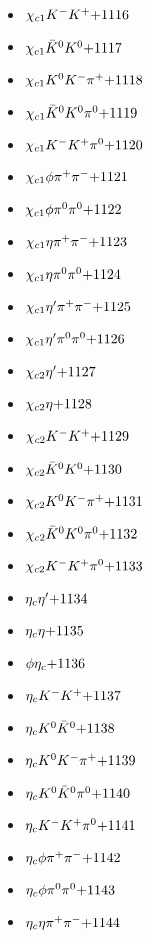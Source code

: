 \begin{multicols}{3}
\begin{itemize}
 \item $ \chi_{c1} K^{-} K^{+} \hfill{+1116}$
 \item $ \chi_{c1} \bar{K}^{0} K^{0} \hfill{+1117}$
 \item $ \chi_{c1} K^{0} K^{-} \pi^{+} \hfill{+1118}$
 \item $ \chi_{c1} \bar{K}^{0} K^{0} \pi^{0} \hfill{+1119}$
 \item $ \chi_{c1} K^{-} K^{+} \pi^{0} \hfill{+1120}$
 \item $ \chi_{c1} \phi \pi^{+} \pi^{-} \hfill{+1121}$
 \item $ \chi_{c1} \phi \pi^{0} \pi^{0} \hfill{+1122}$
 \item $ \chi_{c1} \eta \pi^{+} \pi^{-} \hfill{+1123}$
 \item $ \chi_{c1} \eta \pi^{0} \pi^{0} \hfill{+1124}$
 \item $ \chi_{c1} {\eta^{\prime}} \pi^{+} \pi^{-} \hfill{+1125}$
 \item $ \chi_{c1} {\eta^{\prime}} \pi^{0} \pi^{0} \hfill{+1126}$
 \item $ \chi_{c2} {\eta^{\prime}} \hfill{+1127}$
 \item $ \chi_{c2} \eta \hfill{+1128}$
 \item $ \chi_{c2} K^{-} K^{+} \hfill{+1129}$
 \item $ \chi_{c2} \bar{K}^{0} K^{0} \hfill{+1130}$
 \item $ \chi_{c2} K^{0} K^{-} \pi^{+} \hfill{+1131}$
 \item $ \chi_{c2} \bar{K}^{0} K^{0} \pi^{0} \hfill{+1132}$
 \item $ \chi_{c2} K^{-} K^{+} \pi^{0} \hfill{+1133}$
 \item $ \eta_{c} {\eta^{\prime}} \hfill{+1134}$
 \item $ \eta_{c} \eta \hfill{+1135}$
 \item $ \phi \eta_{c} \hfill{+1136}$
 \item $ \eta_{c} K^{-} K^{+} \hfill{+1137}$
 \item $ \eta_{c} K^{0} \bar{K}^{0} \hfill{+1138}$
 \item $ \eta_{c} K^{0} K^{-} \pi^{+} \hfill{+1139}$
 \item $ \eta_{c} K^{0} \bar{K}^{0} \pi^{0} \hfill{+1140}$
 \item $ \eta_{c} K^{-} K^{+} \pi^{0} \hfill{+1141}$
 \item $ \eta_{c} \phi \pi^{+} \pi^{-} \hfill{+1142}$
 \item $ \eta_{c} \phi \pi^{0} \pi^{0} \hfill{+1143}$
 \item $ \eta_{c} \eta \pi^{+} \pi^{-} \hfill{+1144}$

\end{itemize}
\end{multicols}
